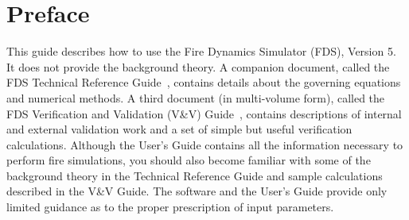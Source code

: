 \documentclass[11pt]{book}
\begin{document}
\begin{minipage}[t][9in][s]{6.25in}


\vspace{3in}

\large
{}

\vfill

\end{minipage}

\clearpage

\frontmatter

\pagestyle{plain}


\chapter{Preface}

This guide describes how to use the Fire Dynamics Simulator (FDS), Version 5.
It does not provide the background theory. A companion document, called the FDS
Technical Reference Guide~\cite{FDS_Tech_Guide_5}, contains details about the governing
equations and numerical methods.
A third document (in multi-volume form), called the FDS Verification and Validation
(V\&V) Guide~\cite{FDS_VV_Guide_5}, contains descriptions of internal and external
validation work and a set of simple but useful verification calculations. Although the User's
Guide contains all the information necessary to perform
fire simulations, you should also become familiar with some of the background theory in the
Technical Reference Guide and sample calculations described in the V\&V Guide.
The software and the User's Guide provide only limited guidance as to the proper prescription
of input parameters.
\end{document}
